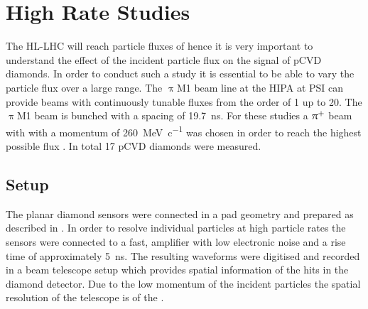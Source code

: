 \section{High Rate Studies}
The \ac{HL-LHC} will reach particle fluxes of  hence it is very important to understand the effect of the incident particle flux on the signal of \ac{pCVD} diamonds. In order to conduct such a study it is essential to be able to vary the particle flux over a large range. The $\uppi$M1 beam line at the \ac{HIPA} at \ac{PSI} \cite{hipa} can provide beams with continuously tunable fluxes from the order of \SI{1}{\khzcm} up to \SI{20}{\mhzcm}. The $\uppi$M1 beam is bunched with a spacing of \SI{19.7}{\nano\second}. For these studies a $\uppi^{\text{+}}$ beam with with a momentum of \SI{260}{\mega\electronvolt\per c}  was chosen in order to reach the highest possible flux \cite{pim1}. In total 17 \ac{pCVD} diamonds were measured.\par
\subsection{Setup}
The planar diamond sensors were connected in a pad geometry and prepared as described in \cite{rainer}. 
In order to resolve individual particles at high particle rates the sensors were connected to a fast, amplifier with low electronic noise and a rise time of approximately \SI{5}{\nano\second}. The resulting waveforms were digitised and recorded in a beam telescope setup which provides spatial information of the hits in the diamond detector. Due to the low momentum of the incident particles the spatial resolution of the telescope is of the .\par
